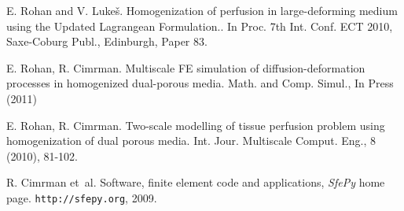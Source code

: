 
\begin{thebibliography}{10}

{\sc E. Rohan and V. Luke\v{s}}. {Homogenization of perfusion in large-deforming medium using the Updated Lagrangean Formulation.}. In Proc. 7th Int. Conf. ECT 2010, Saxe-Coburg Publ., Edinburgh, Paper 83.

E. Rohan, R. Cimrman. 
Multiscale FE simulation of diffusion-deformation processes in
homogenized dual-porous media. 
Math. and Comp. Simul., In Press (2011)

E. Rohan, R. Cimrman. 
Two-scale modelling of tissue perfusion problem using homogenization 
of dual porous media. 
Int. Jour. Multiscale Comput. Eng., 8 (2010), 81-102.

R. Cimrman et~al. Software, finite element code and applications, \emph{SfePy} home page.
{\tt http://sfepy.org}, 2009.

\end{thebibliography}

